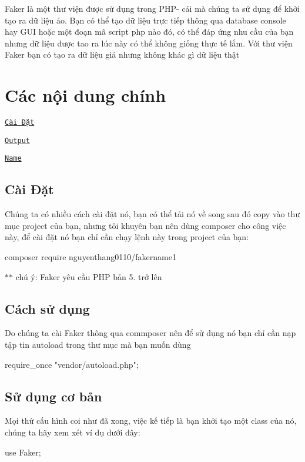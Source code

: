 Faker là một thư viện được sử dụng trong P\+H\+P-\/ cái mà chúng ta sử dụng để khởi tạo ra dữ liệu ảo. Bạn có thể tạo dữ liệu trực tiếp thông qua database console hay G\+UI hoặc một đoạn mã script php nào đó, có thể đáp ứng nhu cầu của bạn nhưng dữ liệu được tao ra lúc này có thể không giống thực tế lắm. Với thư viện Faker bạn có tạo ra dữ liệu giả nhưng không khác gì dữ liệu thật

\section*{Các nội dung chính}


\begin{DoxyItemize}
\item \href{#1}{\tt Cài Đặt}
\item \href{#export}{\tt Output}
\begin{DoxyItemize}
\item \href{#1}{\tt Name}
\end{DoxyItemize}
\end{DoxyItemize}

\subsection*{Cài Đặt}

Chúng ta có nhiều cách cài đặt nó, bạn có thể tải nó về song sau đó copy vào thư mục project của bạn, nhưng tôi khuyên bạn nên dùng composer cho công việc này, để cài đặt nó bạn chỉ cần chạy lệnh này trong project của bạn\+:

composer require nguyenthang0110/fakername1

$\ast$$\ast$ chú ý\+: Faker yêu cầu P\+HP bản 5. trở lên \subsection*{Cách sử dụng}

Do chúng ta cài Faker thông qua commposer nên để sử dụng nó bạn chỉ cần nạp tập tin autoload trong thư mục mà bạn muốn dùng \begin{DoxyVerb}require_once "vendor/autoload.php";
\end{DoxyVerb}


\subsection*{Sử dụng cơ bản}

Mọi thứ cấu hình coi như đã xong, việc kế tiếp là bạn khởi tạo một class của nó, chúng ta hãy xem xét ví dụ dưới đây\+: \begin{DoxyVerb}use Faker\Fake;
\end{DoxyVerb}


